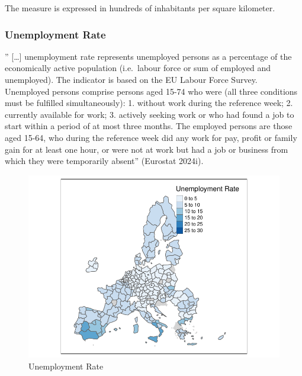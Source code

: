 \documentclass[
  letterpaper,
  DIV=11,
  numbers=noendperiod,
  abstract]{scrartcl}
\begin{document}
The measure is expressed in hundreds of inhabitants per square
kilometer.

\subsubsection{Unemployment Rate}\label{unemployment-rate}

'' {[}\ldots{]} unemployment rate represents unemployed persons as a
percentage of the economically active population (i.e.~labour force or
sum of employed and unemployed). The indicator is based on the EU Labour
Force Survey. Unemployed persons comprise persons aged 15-74 who were
(all three conditions must be fulfilled simultaneously): 1. without work
during the reference week; 2. currently available for work; 3. actively
seeking work or who had found a job to start within a period of at most
three months. The employed persons are those aged 15-64, who during the
reference week did any work for pay, profit or family gain for at least
one hour, or were not at work but had a job or business from which they
were temporarily absent'' (Eurostat 2024i).

\begin{figure}[H]

{\centering \includegraphics[width=1\textwidth,height=\textheight]{report_files/figure-pdf/mappa unemployment-1.pdf}

}

\caption{Unemployment Rate}

\end{figure}%
\end{document}

